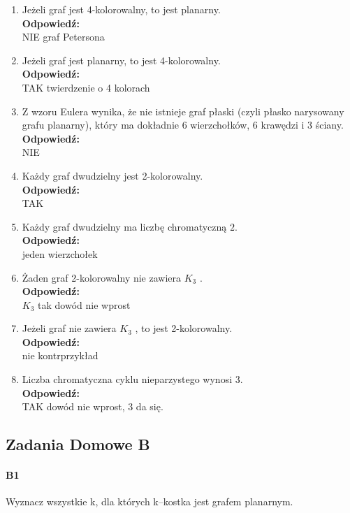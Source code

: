 \documentclass[a4paper,12pt]{article}
\theoremstyle{definition}%
\theoremstyle{definition}
\theoremstyle{problem}
\begin{document}
\begin{enumerate}[label=\alph*)]
\item Jeżeli graf jest 4-kolorowalny, to jest planarny.
\\\textbf{Odpowiedź:} \\ NIE graf Petersona

\item Jeżeli graf jest planarny, to jest 4-kolorowalny.
\\\textbf{Odpowiedź:} \\ TAK twierdzenie o 4 kolorach

\item Z wzoru Eulera wynika, że nie istnieje graf płaski (czyli płasko narysowany grafu planarny), który ma dokładnie $6$ wierzchołków, $6$ krawędzi i $3$ ściany.
\\\textbf{Odpowiedź:} \\ NIE

\item Każdy graf dwudzielny jest 2-kolorowalny.
\\\textbf{Odpowiedź:} \\ TAK

\item Każdy graf dwudzielny ma liczbę chromatyczną $2$.
\\\textbf{Odpowiedź:} \\ jeden wierzchołek

\item Żaden graf 2-kolorowalny nie zawiera $K_3$ .
\\\textbf{Odpowiedź:} \\ $K_3$ tak dowód nie wprost

\item Jeżeli graf nie zawiera $K_3$ , to jest 2-kolorowalny.
\\\textbf{Odpowiedź:} \\ nie kontrprzykład

\item Liczba chromatyczna cyklu nieparzystego wynosi $3$.
\\\textbf{Odpowiedź:} \\ TAK dowód nie wprost, 3 da się.

\end{enumerate}

\subsection{Zadania Domowe B}
\paragraph{B1} Wyznacz wszystkie k, dla których k–kostka jest grafem planarnym.
\end{document}
